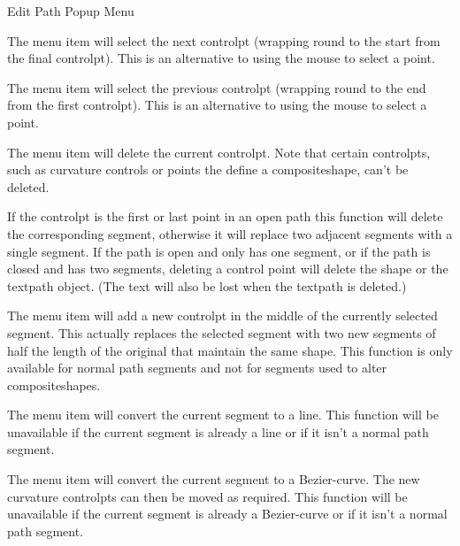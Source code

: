  {}
 {Edit Path Popup Menu}


The  menu item will select the next \gls{controlpt}
(wrapping round to the start from the final \gls{controlpt}).
This is an alternative to using the mouse to select a point.


The  menu item will select the previous \gls{controlpt}
(wrapping round to the end from the first \gls{controlpt}).
This is an alternative to using the mouse to select a point.


The  menu item will delete the current
\gls{controlpt}. 
Note that certain \glspl{controlpt}, such as curvature controls or points
the define a \gls{compositeshape}, can't be deleted.

If the \gls{controlpt} is the first or last point in an open path
this function will delete the corresponding segment, otherwise it
will replace two adjacent segments with a single segment.  If the
path is open and only has one segment, or if the path is closed and
has two segments, deleting a control point will delete the
\gls{shape} or the \gls{textpath} object. (The text will also be lost when
the \gls{textpath} is deleted.)


The  menu item will add a new
\gls{controlpt} in the middle of the currently selected segment.
This actually replaces the selected segment with two new segments of 
half the length of the original that maintain the same shape.
This function is only available for normal path segments and not for
segments used to alter \glspl{compositeshape}.


The  menu item will convert the
current segment to a line. This function will be unavailable if the
current segment is already a line or if it isn't a normal path segment.


The  menu item will convert the
current segment to a \gls{Bezier-curve}. The new curvature 
\glspl{controlpt} can then be moved as required.
This function will be unavailable if the
current segment is already a \gls{Bezier-curve} or if it isn't a normal path segment.


